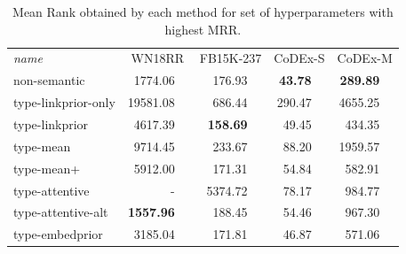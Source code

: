 \begin{table}[p]
    \def\fn{\hspace{2pt}} %
    \setlength{\tabcolsep}{5pt}
    \centering
    \begin{tabular}{lr@{\fn}lr@{\fn}lr@{\fn}lr@{\fn}l}
        \toprule
        \textit{name}
                &\multicolumn{2}{c}{WN18RR}
                            &\multicolumn{2}{c}{FB15K-237}   
                                           & \multicolumn{2}{c}{CoDEx-S}   
                                                                & \multicolumn{2}{c}{CoDEx-M} \\
        \cmidrule{1-9}
        non-semantic         & 1774.06     && 176.93       && \textbf{43.78}            && \textbf{289.89}   \\
        \cmidrule{1-9}
        type-linkprior-only  & 19581.08    && 686.44	   && 290.47           && 4655.25  \\
        type-linkprior       & 4617.39   && \textbf{158.69}       && 49.45     && 434.35   \\
        \cmidrule{1-9}
        type-mean            & 9714.45     && 233.67       && 88.20            && 1959.57  \\
        type-mean+           & 5912.00     && 171.31       && 54.84            && 582.91   \\
        type-attentive       & -           && 5374.72        &%
                                                           & 78.17             && 984.77   \\
        type-attentive-alt   & \textbf{1557.96}     && 188.45       && 54.46            && 967.30   \\
        \cmidrule{1-9}
        type-embedprior      & 3185.04     && 171.81       && 46.87            && 571.06   \\
        \bottomrule
    \end{tabular} \vspace{1em}
    \caption[MR obtained by each method for best set of hyperparameters.]{Mean Rank obtained by each method for set of hyperparameters with highest MRR.} \label{tab:hyperparam-search-results2}
\end{table}

